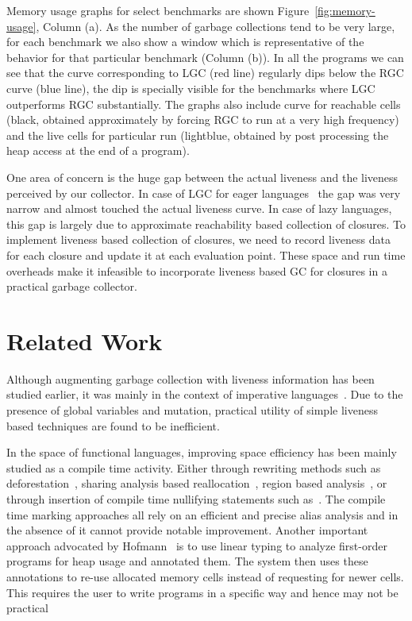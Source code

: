 \documentclass[preprint,9pt]{sigplanconf}
\begin{document}
Memory  usage graphs  for select  benchmarks are  shown
Figure~\ref{fig:memory-usage},  Column   (a).   As  the
number of  garbage collections  tend to be  very large,
for  each benchmark  we  also show  a  window which  is
representative  of  the  behavior for  that  particular
benchmark (Column (b)).  In all the programs we can see
that  the   curve  corresponding  to  LGC   (red  line)
regularly dips below the RGC curve (blue line), the dip
is  specially  visible  for the  benchmarks  where  LGC
outperforms RGC substantially.  The graphs also include
curve    for   reachable    cells   (black,    obtained
approximately  by forcing  RGC to  run at  a very  high
frequency)  and  the  live  cells  for  particular  run
(lightblue, obtained by post processing the heap access
at the end of a program).

One area of concern is  the huge gap between the actual
liveness and  the liveness perceived by  our collector.
In  case of  LGC for  eager languages~\cite{asati14lgc}
the gap was  very narrow and almost  touched the actual
liveness curve.  In case of lazy languages, this gap is
largely   due   to   approximate   reachability   based
collection  of closures.  To  implement liveness  based
collection of closures, we need to record liveness data
for  each  closure and  update  it  at each  evaluation
point.   These space  and  run time  overheads make  it
infeasible  to   incorporate  liveness  based   GC  for
closures in a practical garbage collector.


\section{Related Work} 
\label{sec:relatedwork}
Although  augmenting garbage  collection with  liveness
information has been studied  earlier, it was mainly in
the   context  of   imperative  languages~\cite{Albert,
  Hirzel,  khedker07heap}.   Due  to  the  presence  of
global  variables and  mutation,  practical utility  of
simple  liveness  based  techniques  are  found  to  be
inefficient.

In the  space of functional languages,  improving space
efficiency has  been mainly  studied as a  compile time
activity.   Either through  rewriting  methods such  as
deforestation~\cite{wadler88deforest,gill93ashort,chitil99deforest},
sharing                  analysis                 based
reallocation~\cite{jones89compile},     region    based
analysis~\cite{tofte98region}, or  through insertion of
compile     time     nullifying     statements     such
as~\cite{inoue88analysis,lee05static,Hamilton}.     The
compile  time   marking  approaches  all  rely   on  an
efficient and precise alias analysis and in the absence
of  it  cannot  provide  notable  improvement.  Another
important         approach         advocated         by
Hofmann~\cite{HofmannJ03}  is to  use linear  typing to
analyze  first-order   programs  for  heap   usage  and
annotated them. The system  then uses these annotations
to re-use allocated memory  cells instead of requesting
for  newer  cells.  This  requires the  user  to  write
programs  in  a  specific  way and  hence  may  not  be
practical
\end{document}
